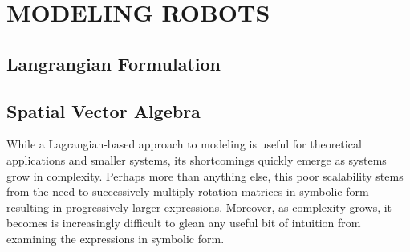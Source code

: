 \chapter{\uppercase{Modeling Robots}}

\section{Langrangian Formulation}

\section{Spatial Vector Algebra}
While a Lagrangian-based approach to modeling is useful for theoretical applications and smaller systems, its shortcomings quickly emerge as systems grow in complexity.
%
Perhaps more than anything else, this poor scalability stems from the need to successively multiply rotation matrices in symbolic form resulting in progressively larger expressions.
%
Moreover, as complexity grows, it becomes is increasingly difficult to glean any useful bit of intuition from examining the expressions in symbolic form.
